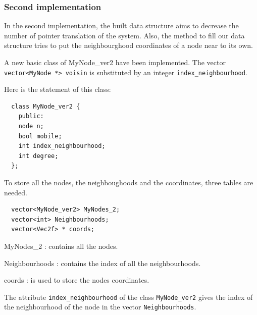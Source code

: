 \subsubsection{Second implementation}
In the second implementation, the built data structure aims to decrease
the number of pointer translation of the system. Also, the method to fill
our data structure tries to put the neighbourghood coordinates of a node 
near to its own.

A new basic class of MyNode\_ver2 have been implemented. The vector \\
\verb+vector<MyNode *> voisin+ is substituted by an integer \verb+index_neighbourhood+.

Here is the statement of this class:

\newpage
\begin{lstlisting}
  class MyNode_ver2 {
    public:
    node n;
    bool mobile;
    int index_neighbourhood;
    int degree;
  };
\end{lstlisting}

To store all the nodes, the neighboughoods and the coordinates, three tables are needed. 

\begin{lstlisting}
  vector<MyNode_ver2> MyNodes_2;
  vector<int> Neighbourhoods;
  vector<Vec2f> * coords;
\end{lstlisting}

\begin{dinglist}{70}
\item[MyNodes\_2]: contains all the nodes.
\item[Neighbourhoods]: contains the index of all the neighbourhoods.
\item[coords]: is used to store the nodes coordinates. 
\end{dinglist}

The attribute \verb+index_neighbourhood+ of the class \verb+MyNode_ver2+
gives the index of the neighbourhood of the node in the vector \verb+Neighbourhoods+.

